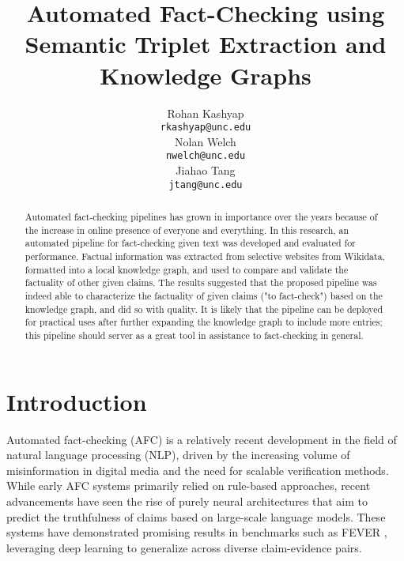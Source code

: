 \documentclass[11pt]{article}
\title{Automated Fact-Checking using Semantic Triplet Extraction and Knowledge Graphs}
\author{
  Rohan Kashyap \\
  \texttt{rkashyap@unc.edu} \\\And
  Nolan Welch \\
  \texttt{nwelch@unc.edu} \\\And
  Jiahao Tang \\
  \texttt{jtang@unc.edu}
}
\begin{document}
\maketitle
\begin{abstract}
Automated fact-checking pipelines has grown in importance over the years because of the increase in online presence of everyone and everything. In this research, an automated pipeline for fact-checking given text was developed and evaluated for performance. Factual information was extracted from selective websites from Wikidata, formatted into a local knowledge graph, and used to compare and validate the factuality of other given claims. The results suggested that the proposed pipeline was indeed able to characterize the factuality of given claims ("to fact-check") based on the knowledge graph, and did so with quality. It is likely that the pipeline can be deployed for practical uses after further expanding the knowledge graph to include more entries; this pipeline should server as a great tool in assistance to fact-checking in general. 
\end{abstract}

\section{Introduction}
Automated fact-checking (AFC) is a relatively recent development in the field of natural language processing (NLP), driven by the increasing volume of misinformation in digital media and the need for scalable verification methods. While early AFC systems primarily relied on rule-based approaches, recent advancements have seen the rise of purely neural architectures that aim to predict the truthfulness of claims based on large-scale language models. These systems have demonstrated promising results in benchmarks such as FEVER \cite{fever}, leveraging deep learning to generalize across diverse claim-evidence pairs.
\end{document}
